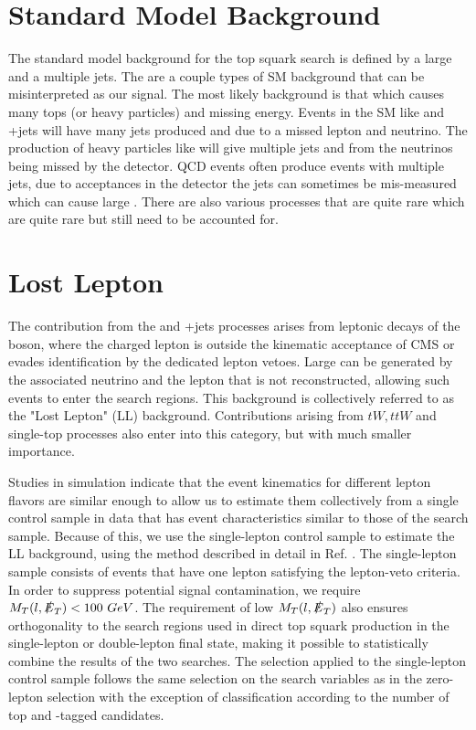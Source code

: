 \section{Standard Model Background}
\label{sec:SMBackground}

The standard model background for the top squark search is defined by a large \met{} and a multiple jets. The are a couple types of SM background that can be misinterpreted as our signal. The most likely background is that which causes many tops (or heavy particles) and missing energy. Events in the SM like \ttbar{} and \W+jets will have many jets produced and \met{} due to a missed lepton and neutrino. The production of heavy particles like \Znunu{} will give multiple jets and \met{} from the neutrinos being missed by the detector. QCD events often produce events with multiple jets, due to acceptances in the detector the jets can sometimes be mis-measured which can cause large \met{}. There are also various processes that are quite rare which are quite rare but still need to be accounted for. 

\section{Lost Lepton}
\label{sec:LL}

The contribution from the \ttbar{} and \W+jets processes arises from leptonic decays of the \W{} boson, where the charged lepton is outside the kinematic acceptance of CMS or evades identification by the dedicated lepton vetoes. Large \met{} can be generated by the associated neutrino and the lepton that is not reconstructed, allowing such events to enter the search regions. This background is collectively referred to as the "Lost Lepton" (LL) background. Contributions arising from $tW, ttW$ and single-top processes also enter into this category, but with much smaller importance. 

Studies in simulation indicate that the event kinematics for different lepton flavors are similar enough to allow us to estimate them collectively from a single control sample in data that has event characteristics similar to those of the search sample. Because of this, we use the single-lepton control sample to estimate the LL background, using the method described in detail in Ref. \cite{bravo_search_2015}. The single-lepton sample consists of events that have one lepton satisfying the lepton-veto criteria. In order to suppress potential signal contamination, we require $M_T(l,\slashed{E}_{T})<100~GeV$. The requirement of low $M_T(l,\slashed{E}_{T})$ also ensures orthogonality to the search regions used in direct top squark production in the single-lepton or double-lepton final state, making it possible to statistically combine the results of the two searches. The selection applied to the single-lepton control sample follows the same selection on the search variables as in the zero-lepton selection with the exception of classification according to the number of top and \W-tagged candidates. 

